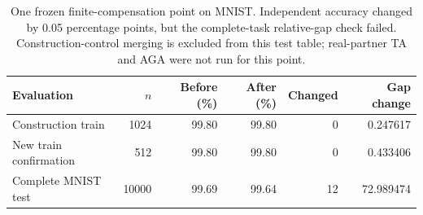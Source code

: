 \begin{table}[t]
\centering
\small
\begin{tabular}{lrrrrr}
\toprule
Evaluation & $n$ & Before (\%) & After (\%) & Changed & Gap change \\
\midrule
Construction train & 1024 & 99.80 & 99.80 & 0 & 0.247617 \\
New train confirmation & 512 & 99.80 & 99.80 & 0 & 0.433406 \\
Complete MNIST test & 10000 & 99.69 & 99.64 & 12 & 72.989474 \\
\bottomrule
\end{tabular}
\caption{One frozen finite-compensation point on MNIST. Independent accuracy changed by 0.05 percentage points, but the complete-task relative-gap check failed. Construction-control merging is excluded from this test table; real-partner TA and AGA were not run for this point.}
\label{tab:finite-compensation-native}
\end{table}
